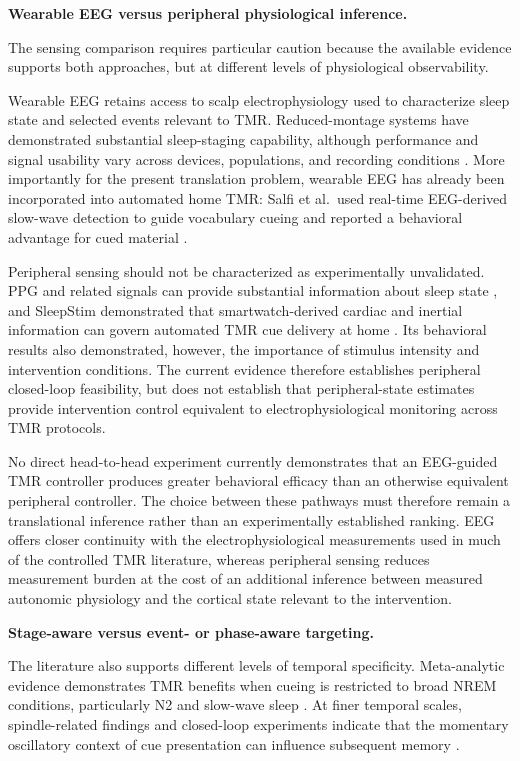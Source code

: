 \noindent\textbf{Wearable EEG versus peripheral physiological inference.}

The sensing comparison requires particular caution because the available
evidence supports both approaches, but at different levels of physiological
observability.

Wearable EEG retains access to scalp electrophysiology used to characterize
sleep state and selected events relevant to TMR. Reduced-montage systems have
demonstrated substantial sleep-staging capability, although performance and
signal usability vary across devices, populations, and recording conditions
\citep{arnal2020dreem,ravindran2025dreem}. More importantly for the present
translation problem, wearable EEG has already been incorporated into automated
home TMR: Salfi et al.\ used real-time EEG-derived slow-wave detection to guide
vocabulary cueing and reported a behavioral advantage for cued material
\citep{salfi2025promoting}.

Peripheral sensing should not be characterized as experimentally unvalidated.
PPG and related signals can provide substantial information about sleep state
\citep{korkalainen2020ppg}, and SleepStim demonstrated that smartwatch-derived
cardiac and inertial information can govern automated TMR cue delivery at home
\citep{whitmore2022improving}. Its behavioral results also demonstrated,
however, the importance of stimulus intensity and intervention conditions.
The current evidence therefore establishes peripheral closed-loop feasibility,
but does not establish that peripheral-state estimates provide intervention
control equivalent to electrophysiological monitoring across TMR protocols.

No direct head-to-head experiment currently demonstrates that an EEG-guided TMR
controller produces greater behavioral efficacy than an otherwise equivalent
peripheral controller. The choice between these pathways must therefore remain a
translational inference rather than an experimentally established ranking.
EEG offers closer continuity with the electrophysiological measurements used in
much of the controlled TMR literature, whereas peripheral sensing reduces
measurement burden at the cost of an additional inference between measured
autonomic physiology and the cortical state relevant to the intervention.


\noindent\textbf{Stage-aware versus event- or phase-aware targeting.}

The literature also supports different levels of temporal specificity.
Meta-analytic evidence demonstrates TMR benefits when cueing is restricted to
broad NREM conditions, particularly N2 and slow-wave sleep
\citep{hu2020promoting}. At finer temporal scales, spindle-related findings and
closed-loop experiments indicate that the momentary oscillatory context of cue
presentation can influence subsequent memory
\citep{antony2018spindle,shimizu2018closedloop,ngo2022shaping,
nicolas2025phase}.

